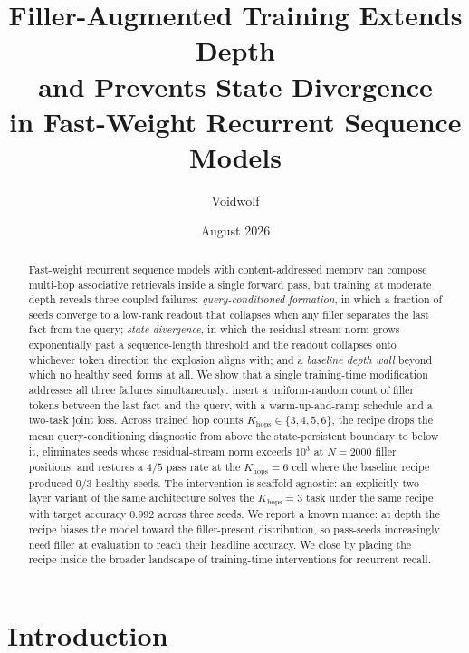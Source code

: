 \documentclass[11pt]{article}
\title{Filler-Augmented Training Extends Depth\\ and Prevents State Divergence\\ in Fast-Weight Recurrent Sequence Models}
\author[1]{Voidwolf}
\affil[1]{Independent \\ \texttt{research@voidwolf.space}}
\date{August 2026}
\begin{document}
\maketitle

\begin{abstract}
Fast-weight recurrent sequence models with content-addressed memory
can compose multi-hop associative retrievals inside a single forward
pass, but training at moderate depth reveals three coupled failures:
\emph{query-conditioned formation}, in which a fraction of seeds
converge to a low-rank readout that collapses when any filler
separates the last fact from the query; \emph{state divergence}, in
which the residual-stream norm grows exponentially past a
sequence-length threshold and the readout collapses onto whichever
token direction the explosion aligns with; and a
\emph{baseline depth wall} beyond which no healthy seed forms at all.
We show that a single training-time modification addresses all
three failures simultaneously: insert a uniform-random count of
filler tokens between the last fact and the query, with a
warm-up-and-ramp schedule and a two-task joint loss. Across trained hop
counts $K_{\mathrm{hops}} \in \{3, 4, 5, 6\}$, the recipe drops the
mean query-conditioning diagnostic from above the state-persistent
boundary to below it, eliminates seeds whose residual-stream norm
exceeds $10^3$ at $N=2000$ filler positions, and restores a $4/5$
pass rate at the $K_{\mathrm{hops}}=6$ cell where the baseline recipe
produced $0/3$ healthy seeds. The intervention is scaffold-agnostic:
an explicitly two-layer variant of the same architecture solves the
$K_{\mathrm{hops}}=3$ task under the same recipe with target
accuracy $0.992$ across three seeds. We report a known nuance: at depth the recipe biases the model
toward the filler-present distribution, so pass-seeds increasingly
need filler at evaluation to reach their headline accuracy. We
close by placing the recipe inside the broader landscape of
training-time interventions for recurrent recall.
\end{abstract}

\section{Introduction}
\label{sec:intro}
\end{document}
